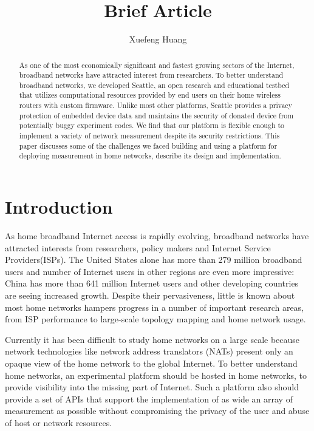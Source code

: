 \documentclass[11pt, oneside]{article}   	%
\title{Brief Article}
\author{Xuefeng Huang}
\begin{document}
\maketitle
\begin{abstract}
As one of the most economically significant and fastest growing sectors of the Internet, broadband networks have attracted interest from researchers. To better understand broadband networks, we developed Seattle, an open research and educational testbed that utilizes computational resources provided by end users on their home wireless routers with custom firmware. Unlike most other platforms, Seattle provides a privacy protection of embedded device data and maintains the security of donated device from potentially buggy experiment codes. We find that our platform is flexible enough to implement a variety of network measurement despite its security restrictions. This paper discusses some of the challenges we faced building and using a platform for deploying measurement in home networks, describe its design and implementation.
\end{abstract}
\section{Introduction}
\label{sec.introduction}
As home broadband Internet access is rapidly evolving, broadband networks have attracted interests from researchers, policy makers and Internet Service Providers(ISPs). The United States alone has more than 279 million broadband users and number of Internet users in other regions are even more impressive: China has more than 641 million Internet users and other developing countries are seeing increased growth. Despite their pervasiveness, little is known about most home networks hampers progress in a number of important research areas, from ISP performance to large-scale topology mapping and home network usage.

Currently it has been difficult to study home networks on a large scale because network technologies like network address translators (NATs) present only an opaque view of the home network to the global Internet. To better understand home networks, an experimental platform should be hosted in home networks, to provide visibility into the missing part of Internet. Such a platform also should provide a set of APIs that support the implementation of as wide an array of measurement as possible without compromising the privacy of the user and abuse of host or network resources. 
\end{document}
